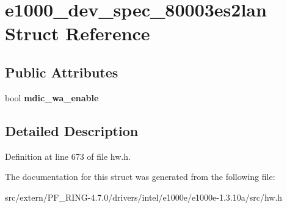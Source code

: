 \hypertarget{structe1000__dev__spec__80003es2lan}{
\section{e1000\_\-dev\_\-spec\_\-80003es2lan Struct Reference}
\label{structe1000__dev__spec__80003es2lan}
}
\subsection*{Public Attributes}
\begin{DoxyCompactItemize}
\item 
\hypertarget{structe1000__dev__spec__80003es2lan_aa93e71322282e4804d5d48b374293cde}{
bool {\bfseries mdic\_\-wa\_\-enable}}
\label{structe1000__dev__spec__80003es2lan_aa93e71322282e4804d5d48b374293cde}

\end{DoxyCompactItemize}


\subsection{Detailed Description}


Definition at line 673 of file hw.h.



The documentation for this struct was generated from the following file:\begin{DoxyCompactItemize}
\item 
src/extern/PF\_\-RING-\/4.7.0/drivers/intel/e1000e/e1000e-\/1.3.10a/src/hw.h\end{DoxyCompactItemize}
